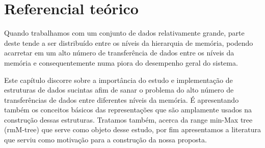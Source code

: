 \chapter{Referencial teórico}\label{ch:fundamentacao}

Quando trabalhamos com um conjunto de dados relativamente grande, parte deste tende a ser distribuído entre os níveis da hierarquia de memória, podendo acarretar em um alto número de transferência de dados entre os níveis da memória e consequentemente numa piora do desempenho geral do sistema. 

Este capítulo discorre sobre a importância do estudo e implementação de estruturas de dados sucintas afim de sanar o problema do alto número de transferências de dados entre diferentes níveis da memória. É apresentando também os conceitos básicos das representações que são amplamente usados na construção dessas estruturas. Tratamos também, acerca da range min-Max tree (rmM-tree) que serve como objeto desse estudo, por fim apresentamos a literatura que serviu como motivação para a construção da nossa proposta. 


